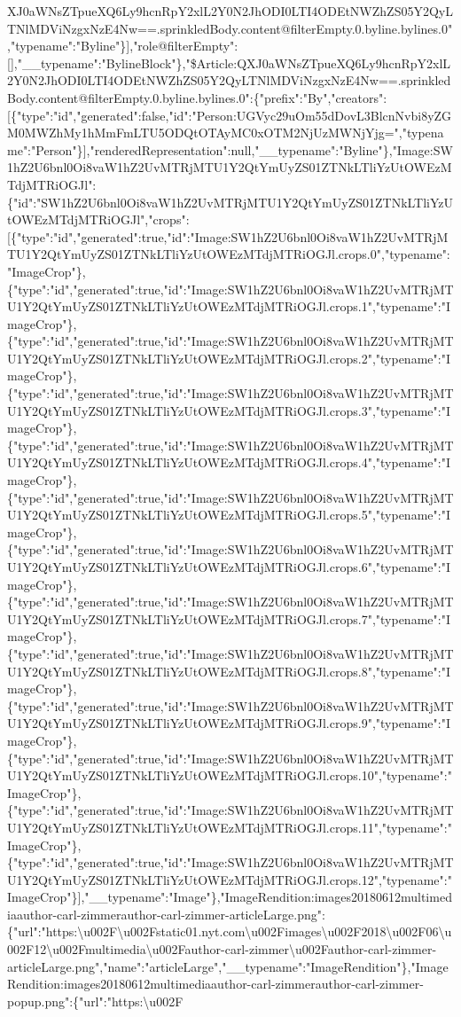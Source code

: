 XJ0aWNsZTpueXQ6Ly9hcnRpY2xlL2Y0N2JhODI0LTI4ODEtNWZhZS05Y2QyLTNlMDViNzgxNzE4Nw==.sprinkledBody.content@filterEmpty.0.byline.bylines.0","typename":"Byline"\}{]},"role@filterEmpty":{[}{]},"\_\_typename":"BylineBlock"\},"\$Article:QXJ0aWNsZTpueXQ6Ly9hcnRpY2xlL2Y0N2JhODI0LTI4ODEtNWZhZS05Y2QyLTNlMDViNzgxNzE4Nw==.sprinkledBody.content@filterEmpty.0.byline.bylines.0":\{"prefix":"By","creators":{[}\{"type":"id","generated":false,"id":"Person:UGVyc29uOm55dDovL3BlcnNvbi8yZGM0MWZhMy1hMmFmLTU5ODQtOTAyMC0xOTM2NjUzMWNjYjg=","typename":"Person"\}{]},"renderedRepresentation":null,"\_\_typename":"Byline"\},"Image:SW1hZ2U6bnl0Oi8vaW1hZ2UvMTRjMTU1Y2QtYmUyZS01ZTNkLTliYzUtOWEzMTdjMTRiOGJl":\{"id":"SW1hZ2U6bnl0Oi8vaW1hZ2UvMTRjMTU1Y2QtYmUyZS01ZTNkLTliYzUtOWEzMTdjMTRiOGJl","crops":{[}\{"type":"id","generated":true,"id":"Image:SW1hZ2U6bnl0Oi8vaW1hZ2UvMTRjMTU1Y2QtYmUyZS01ZTNkLTliYzUtOWEzMTdjMTRiOGJl.crops.0","typename":"ImageCrop"\},\{"type":"id","generated":true,"id":"Image:SW1hZ2U6bnl0Oi8vaW1hZ2UvMTRjMTU1Y2QtYmUyZS01ZTNkLTliYzUtOWEzMTdjMTRiOGJl.crops.1","typename":"ImageCrop"\},\{"type":"id","generated":true,"id":"Image:SW1hZ2U6bnl0Oi8vaW1hZ2UvMTRjMTU1Y2QtYmUyZS01ZTNkLTliYzUtOWEzMTdjMTRiOGJl.crops.2","typename":"ImageCrop"\},\{"type":"id","generated":true,"id":"Image:SW1hZ2U6bnl0Oi8vaW1hZ2UvMTRjMTU1Y2QtYmUyZS01ZTNkLTliYzUtOWEzMTdjMTRiOGJl.crops.3","typename":"ImageCrop"\},\{"type":"id","generated":true,"id":"Image:SW1hZ2U6bnl0Oi8vaW1hZ2UvMTRjMTU1Y2QtYmUyZS01ZTNkLTliYzUtOWEzMTdjMTRiOGJl.crops.4","typename":"ImageCrop"\},\{"type":"id","generated":true,"id":"Image:SW1hZ2U6bnl0Oi8vaW1hZ2UvMTRjMTU1Y2QtYmUyZS01ZTNkLTliYzUtOWEzMTdjMTRiOGJl.crops.5","typename":"ImageCrop"\},\{"type":"id","generated":true,"id":"Image:SW1hZ2U6bnl0Oi8vaW1hZ2UvMTRjMTU1Y2QtYmUyZS01ZTNkLTliYzUtOWEzMTdjMTRiOGJl.crops.6","typename":"ImageCrop"\},\{"type":"id","generated":true,"id":"Image:SW1hZ2U6bnl0Oi8vaW1hZ2UvMTRjMTU1Y2QtYmUyZS01ZTNkLTliYzUtOWEzMTdjMTRiOGJl.crops.7","typename":"ImageCrop"\},\{"type":"id","generated":true,"id":"Image:SW1hZ2U6bnl0Oi8vaW1hZ2UvMTRjMTU1Y2QtYmUyZS01ZTNkLTliYzUtOWEzMTdjMTRiOGJl.crops.8","typename":"ImageCrop"\},\{"type":"id","generated":true,"id":"Image:SW1hZ2U6bnl0Oi8vaW1hZ2UvMTRjMTU1Y2QtYmUyZS01ZTNkLTliYzUtOWEzMTdjMTRiOGJl.crops.9","typename":"ImageCrop"\},\{"type":"id","generated":true,"id":"Image:SW1hZ2U6bnl0Oi8vaW1hZ2UvMTRjMTU1Y2QtYmUyZS01ZTNkLTliYzUtOWEzMTdjMTRiOGJl.crops.10","typename":"ImageCrop"\},\{"type":"id","generated":true,"id":"Image:SW1hZ2U6bnl0Oi8vaW1hZ2UvMTRjMTU1Y2QtYmUyZS01ZTNkLTliYzUtOWEzMTdjMTRiOGJl.crops.11","typename":"ImageCrop"\},\{"type":"id","generated":true,"id":"Image:SW1hZ2U6bnl0Oi8vaW1hZ2UvMTRjMTU1Y2QtYmUyZS01ZTNkLTliYzUtOWEzMTdjMTRiOGJl.crops.12","typename":"ImageCrop"\}{]},"\_\_typename":"Image"\},"ImageRendition:images20180612multimediaauthor-carl-zimmerauthor-carl-zimmer-articleLarge.png":\{"url":"https:\textbackslash{}u002F\textbackslash{}u002Fstatic01.nyt.com\textbackslash{}u002Fimages\textbackslash{}u002F2018\textbackslash{}u002F06\textbackslash{}u002F12\textbackslash{}u002Fmultimedia\textbackslash{}u002Fauthor-carl-zimmer\textbackslash{}u002Fauthor-carl-zimmer-articleLarge.png","name":"articleLarge","\_\_typename":"ImageRendition"\},"ImageRendition:images20180612multimediaauthor-carl-zimmerauthor-carl-zimmer-popup.png":\{"url":"https:\textbackslash{}u002F\textbacksl